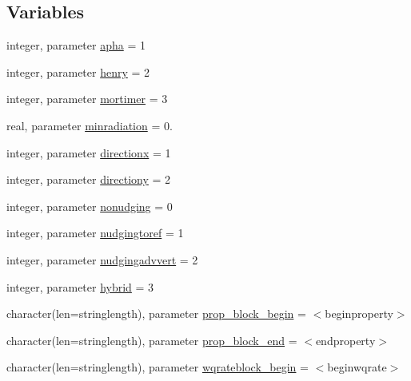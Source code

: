 \subsection*{Variables}
\begin{DoxyCompactItemize}
\item 
integer, parameter \mbox{\hyperlink{namespacemodulewaterproperties_ad3d25ef03f7249eeb914147244f7ab21}{apha}} = 1
\item 
integer, parameter \mbox{\hyperlink{namespacemodulewaterproperties_a29e2fbba778edc06bcf727039bbd9798}{henry}} = 2
\item 
integer, parameter \mbox{\hyperlink{namespacemodulewaterproperties_a6bcd9e391a74b1ca62e61cc243476fdc}{mortimer}} = 3
\item 
real, parameter \mbox{\hyperlink{namespacemodulewaterproperties_a25034c41764dc77e32aba6c415fcc49d}{minradiation}} = 0.
\item 
integer, parameter \mbox{\hyperlink{namespacemodulewaterproperties_ad679645e03dadde260138305d457c6b0}{directionx}} = 1
\item 
integer, parameter \mbox{\hyperlink{namespacemodulewaterproperties_aaf6db3a146aad58618195cc2c0205df5}{directiony}} = 2
\item 
integer, parameter \mbox{\hyperlink{namespacemodulewaterproperties_aff38a3e9a22cffe62976100b9a502857}{nonudging}} = 0
\item 
integer, parameter \mbox{\hyperlink{namespacemodulewaterproperties_a11b343623ee8be4de6631eeaebc7960f}{nudgingtoref}} = 1
\item 
integer, parameter \mbox{\hyperlink{namespacemodulewaterproperties_a5526d1183ef0c5a2ac7a8102b28c7d15}{nudgingadvvert}} = 2
\item 
integer, parameter \mbox{\hyperlink{namespacemodulewaterproperties_aeb738ab690aa82280436c15d6500e8c3}{hybrid}} = 3
\item 
character(len=stringlength), parameter \mbox{\hyperlink{namespacemodulewaterproperties_a116b016e9840d891b6aa364194ef54a4}{prop\+\_\+block\+\_\+begin}} = \textquotesingle{}$<$beginproperty$>$\textquotesingle{}
\item 
character(len=stringlength), parameter \mbox{\hyperlink{namespacemodulewaterproperties_a6ebea2163c7a405c3147a1c638cccd1f}{prop\+\_\+block\+\_\+end}} = \textquotesingle{}$<$endproperty$>$\textquotesingle{}
\item 
character(len=stringlength), parameter \mbox{\hyperlink{namespacemodulewaterproperties_afcb8158a31eb190cd761c4a78545fd9f}{wqrateblock\+\_\+begin}} = \textquotesingle{}$<$beginwqrate$>$\textquotesingle{}

\end{DoxyCompactItemize}
